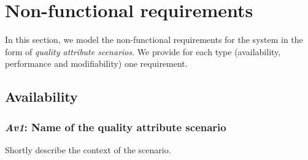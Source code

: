 \documentclass[a4paper,10pt]{article}
\begin{document}

\section{Non-functional requirements}\label{sec:non-functional}
In this section, we model the non-functional requirements for the system in the
form of \emph{quality attribute scenarios}. We provide for each type
(availability, performance and modifiability) one requirement.

\subsection{Availability}
\subsubsection{\emph{Av1}: Name of the quality attribute scenario}
Shortly describe the context of the scenario.
\end{document}
